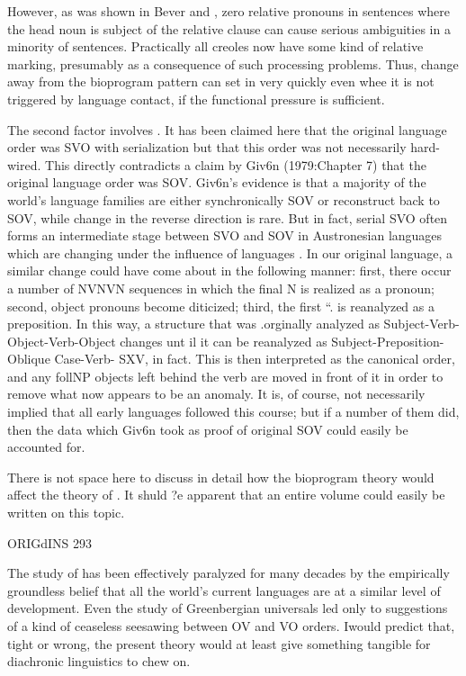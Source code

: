 However, as was shown in Bever and \citet{Langendoen1971}, zero relative pronouns in sentences where the head noun is subject of the relative clause can cause serious ambiguities in a minority of sentences. Practically all creoles now have some kind of relative marking, pre\-sumably as a consequence of such processing problems. Thus, change away from the bioprogram pattern can set in very quickly even whee it is not triggered by language contact, if the functional pressure is sufficient.

The second factor involves . It has been claimed here that the original language order was SVO with serialization but that this order was not necessarily hard-wired. This directly contradicts a claim by Giv6n (1979:Chapter 7) that the original language order was SOV. Giv6n's evidence is that a majority of the world's language families are either synchronically SOV or reconstruct back to SOV, while change in the reverse direction is rare. But in fact, serial SVO often forms an intermediate stage between SVO and SOV in Austro\-nesian languages which are changing under the influence of  languages \citep{Bradshaw1979}. In our original language, a similar change could have come about in the following manner: first, there occur a number of NVNVN sequences in which the final N is realized as a pronoun; second, object pronouns become diticized; third, the first ``. is reanalyzed as a preposition. In this way, a structure that was .or\-ginally analyzed as Subject-Verb-Object-Verb-Object changes unt il it can be reanalyzed as Subject-Preposition-Oblique Case-Verb- SXV, in fact. This is then interpreted as the canonical order, and any foll\-NP objects left behind the verb are moved in front of it in order to remove what now appears to be an anomaly. It is, of course, not necessarily implied that all early languages followed this course; but if a number of them did, then the data which Giv6n took as proof of original SOV could easily be accounted for.

There is not space here to discuss in detail how the bioprogram theory would affect the theory of . It shuld ?e apparent that an entire volume could easily be written on this topic.


ORIGdINS 293

The study of  has been effectively paralyzed for many decades by the empirically groundless belief that all the world's current languages are at a similar level of development. Even the study of Greenbergian universals led only to suggestions of a kind of ceaseless seesawing between OV and VO orders. Iwould predict that, tight or wrong, the present theory would at least give something tangible for diachronic linguistics to chew on.

